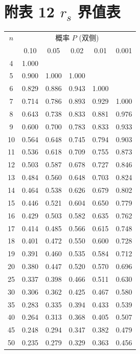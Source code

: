 \documentclass[lang=cn,10pt]{elegantbook}
\begin{document}
\newpage

\section{附表 12 $r_s$ 界值表}
\begin{longtable}{c|ccccc}
    \hline
    $n$ & \multicolumn{5}{c}{概率 $P$ (双侧)} \\
    & 0.10 & 0.05 & 0.02 & 0.01 & 0.001 \\
    \hline
    \endhead
    4  & 1.000 & & & & \\
    5  & 0.900 & 1.000 & 1.000 & & \\
    6  & 0.829 & 0.886 & 0.943 & 1.000 & \\
    7  & 0.714 & 0.786 & 0.893 & 0.929 & 1.000 \\
    8  & 0.643 & 0.738 & 0.833 & 0.881 & 0.976 \\
    9  & 0.600 & 0.700 & 0.783 & 0.833 & 0.933 \\
    10 & 0.564 & 0.648 & 0.745 & 0.794 & 0.903 \\
    11 & 0.536 & 0.618 & 0.709 & 0.755 & 0.873 \\
    12 & 0.503 & 0.587 & 0.678 & 0.727 & 0.846 \\
    13 & 0.484 & 0.560 & 0.648 & 0.703 & 0.824 \\
    14 & 0.464 & 0.538 & 0.626 & 0.679 & 0.802 \\
    15 & 0.446 & 0.521 & 0.604 & 0.650 & 0.779 \\
    16 & 0.429 & 0.503 & 0.582 & 0.635 & 0.762 \\
    17 & 0.414 & 0.485 & 0.566 & 0.615 & 0.748 \\
    18 & 0.401 & 0.472 & 0.550 & 0.600 & 0.728 \\
    19 & 0.391 & 0.460 & 0.535 & 0.584 & 0.712 \\
    20 & 0.380 & 0.447 & 0.520 & 0.570 & 0.696 \\
    25 & 0.337 & 0.398 & 0.466 & 0.511 & 0.630 \\
    30 & 0.306 & 0.362 & 0.425 & 0.467 & 0.580 \\
    35 & 0.283 & 0.335 & 0.394 & 0.433 & 0.539 \\
    40 & 0.264 & 0.313 & 0.368 & 0.405 & 0.507 \\
    45 & 0.248 & 0.294 & 0.347 & 0.382 & 0.479 \\
    50 & 0.235 & 0.279 & 0.329 & 0.363 & 0.456 \\
    \hline
\end{longtable}
\end{document}
